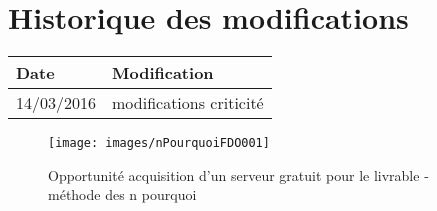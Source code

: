\section*{Historique des modifications}
\begin{table}[h]
\centering
	\begin{tabularx}{16.8cm}{|X|X|}
	\hline
	\rowcolor{gray!40} Date & Modification \\
	\hline
	 14/03/2016 & modifications criticité \\
	\hline
	\end{tabularx}
\end{table}
\newpage


\begin{figure}
	\centering
	\texttt{[image: images/nPourquoiFDO001]}
	\caption{\label{opportunite acquisition d'un serveur gratuit pour le livrable}Opportunité acquisition d'un serveur gratuit pour le livrable - méthode des n pourquoi}
\end{figure}
